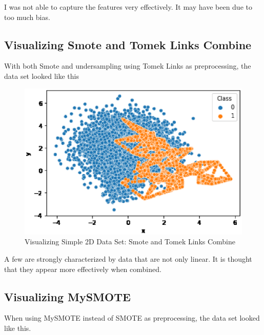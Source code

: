 I was not able to capture the features very effectively. It may have been due to too much bias.

\clearpage
\subsection{Visualizing Smote and Tomek Links Combine}
With both Smote and undersampling using Tomek Links as preprocessing, the data set looked like this
\begin{center}
    \begin{figure}[ht]
        \caption{Visualizing Simple 2D Data Set: Smote and Tomek Links Combine}
        \label{tab:team-rating-features}
        \begin{center}
            \includegraphics[scale=0.6]{image/combine.eps}
        \end{center}
    \end{figure}
\end{center}

A few are strongly characterized by data that are not only linear. It is thought that they appear more effectively when combined.

\clearpage
\subsection{Visualizing MySMOTE}
When using MySMOTE instead of SMOTE as preprocessing, the data set looked like this.

